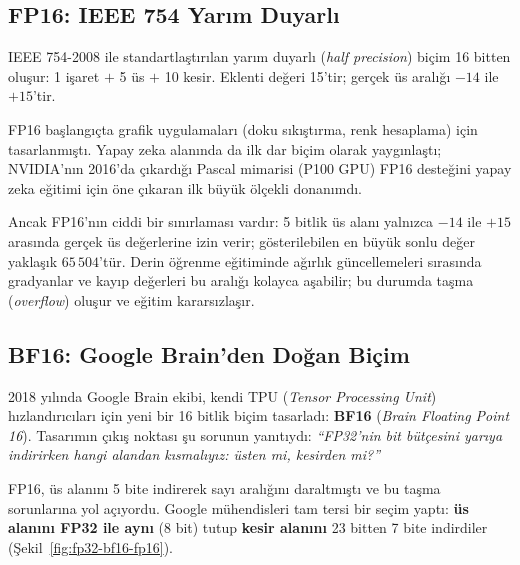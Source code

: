 \subsection{FP16: IEEE 754 Yarım Duyarlı}

IEEE 754-2008 ile standartlaştırılan yarım duyarlı (\emph{half precision}) biçim 16 bitten oluşur: 1 işaret $+$ 5 üs $+$ 10 kesir. Eklenti değeri 15'tir; gerçek üs aralığı $-14$ ile $+15$'tir.

FP16 başlangıçta grafik uygulamaları (doku sıkıştırma, renk hesaplama) için tasarlanmıştı. Yapay zeka alanında da ilk dar biçim olarak yaygınlaştı; NVIDIA'nın 2016'da çıkardığı Pascal mimarisi (P100 GPU) FP16 desteğini yapay zeka eğitimi için öne çıkaran ilk büyük ölçekli donanımdı.

Ancak FP16'nın ciddi bir sınırlaması vardır: 5 bitlik üs alanı yalnızca $-14$ ile $+15$ arasında gerçek üs değerlerine izin verir; gösterilebilen en büyük sonlu değer yaklaşık $65\,504$'tür. Derin öğrenme eğitiminde ağırlık güncellemeleri sırasında gradyanlar ve kayıp değerleri bu aralığı kolayca aşabilir; bu durumda taşma (\emph{overflow}) oluşur ve eğitim kararsızlaşır.

\subsection{BF16: Google Brain'den Doğan Biçim}

2018 yılında Google Brain ekibi, kendi TPU (\emph{Tensor Processing Unit}) hızlandırıcıları için yeni bir 16 bitlik biçim tasarladı: \textbf{BF16} (\emph{Brain Floating Point 16}). Tasarımın çıkış noktası şu sorunun yanıtıydı: \emph{``FP32'nin bit bütçesini yarıya indirirken hangi alandan kısmalıyız: üsten mi, kesirden mi?''}

FP16, üs alanını 5 bite indirerek sayı aralığını daraltmıştı ve bu taşma sorunlarına yol açıyordu. Google mühendisleri tam tersi bir seçim yaptı: \textbf{üs alanını FP32 ile aynı} (8 bit) tutup \textbf{kesir alanını} 23 bitten 7 bite indirdiler (Şekil~\ref{fig:fp32-bf16-fp16}).

